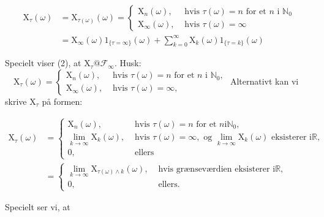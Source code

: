 \documentclass{article}
\newcommand{\1}{\mathbbm{1}}
\theoremstyle{boxed}
\begin{document}
$$
\begin{aligned}
\mathrm{X}_\tau(\omega) & =\mathrm{X}_{\tau(\omega)}(\omega)= \begin{cases}\mathrm{X}_n(\omega), & \text { hvis } \tau(\omega)=n \text { for et } n \text { i } \mathbb{N}_0 \\
\mathrm{X}_{\infty}(\omega), & \text { hvis } \tau(\omega)=\infty\end{cases} \\
& =\mathrm{X}_{\infty}(\omega) 1_{\{\tau=\infty\}}(\omega)+\sum_{k=0}^{\infty} \mathrm{X}_k(\omega) 1_{\{\tau=k\}}(\omega)
\end{aligned}
$$


Specielt viser (2), at $\mathrm{X}_\tau @ \mathcal{F}_{\infty}$.
Husk: $\quad \mathrm{X}_\tau(\omega)= \begin{cases}\mathrm{X}_n(\omega), & \text { hvis } \tau(\omega)=n \text { for et } n \text { i } \mathbb{N}_0, \\ \mathrm{X}_{\infty}(\omega), & \text { hvis } \tau(\omega)=\infty,\end{cases}$
Alternativt kan vi skrive $\mathrm{X}_\tau$ på formen:

$$
\begin{aligned}
\mathrm{X}_\tau(\omega) & = \begin{cases}\mathrm{X}_n(\omega), & \text { hvis } \tau(\omega)=n \text { for et } n \mathrm{i} \mathbb{N}_0, \\
\lim _{k \rightarrow \infty} \mathrm{X}_k(\omega), & \text { hvis } \tau(\omega)=\infty, \text { og } \lim _{k \rightarrow \infty} \mathrm{X}_k(\omega) \text { eksisterer } \mathrm{i} \mathbb{R}, \\
0, & \text { ellers }\end{cases} \\
& = \begin{cases}\lim _{k \rightarrow \infty} \mathrm{X}_{\tau(\omega) \wedge k}(\omega), & \text { hvis grænseværdien eksisterer } \mathrm{i} \mathbb{R}, \\
0, & \text { ellers. }\end{cases}
\end{aligned}
$$


Specielt ser vi, at
\end{document}
